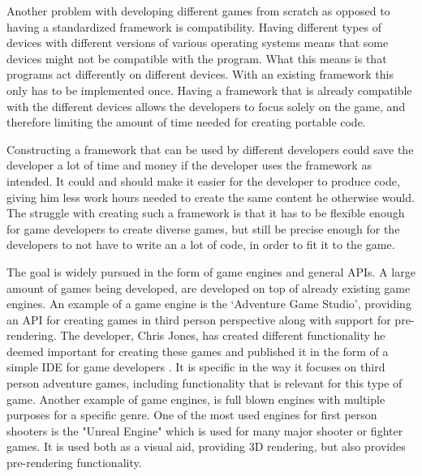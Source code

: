 Another problem with developing different games from scratch as opposed to having a standardized framework is compatibility. Having different types of devices with different versions of various operating systems means that some devices might not be compatible with the program. What this means is that programs act differently on different devices. With an existing framework this only has to be implemented once. Having a framework that is already compatible with the different devices allows the developers to focus solely on the game, and therefore limiting the amount of time needed for creating portable code.

Constructing a framework that can be used by different developers could save the developer a lot of time and money if the developer uses the framework as intended. It could and should make it easier for the developer to produce code, giving him less work hours needed to create the same content he otherwise would. The struggle with creating such a framework is that it has to be flexible enough for game developers to create diverse games, but still be precise enough for the developers to not have to write an a lot of code, in order to fit it to the game.

The goal is widely pursued in the form of game engines and general APIs. A large amount of games being developed, are developed on top of already existing game engines. An example of a game engine is the `Adventure Game Studio', providing an API for creating games in third person perspective along with support for pre-rendering. The developer, Chris Jones, has created different functionality he deemed important for creating these games and published it in the form of a simple IDE for game developers \cite{adv-game}. It is specific in the way it focuses on third person adventure games, including functionality that is relevant for this type of game.
Another example of game engines, is full blown engines with multiple purposes for a specific genre. One of the most used engines for first person shooters is the "Unreal Engine" which is used for many major shooter or fighter games. It is used both as a visual aid, providing 3D rendering, but also provides pre-rendering functionality.




